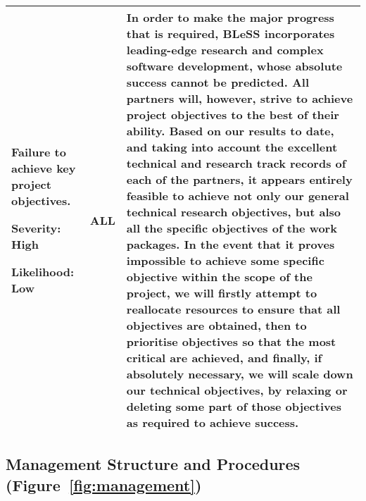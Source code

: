 \documentclass[a4paper,11pt]{article}
\newcommand{\project}[1]{\textbf{#1}\xspace}
\newcommand{\BLESS}{\project{BLeSS}}
\newcommand{\TheProject}{\BLESS}
\begin{document}
\begin{longtable}{| p{3.5cm} | p{1.5cm} | p{11.8cm}  |}
Failure to achieve key project objectives.
\par\vspace{1ex}
\textbf{Severity: High}
\par
\textbf{Likelihood: Low} &
ALL & 
In order to make the major progress that is required,
\TheProject{} incorporates leading-edge
research and complex software development, whose absolute success cannot be predicted. 
All partners will, however, strive to achieve project objectives
to the best of their ability.  Based on our results to date, and taking into account
the excellent technical and research track records of each of
the partners, it appears entirely feasible to achieve not only our general
technical research objectives, but also all the specific objectives
of the work packages.  In the event that it
proves impossible to achieve some specific objective within the
scope of the project, we will firstly attempt to reallocate
resources to ensure that all objectives are obtained, then
to prioritise objectives so that the most critical are achieved,
and finally, if absolutely necessary, we will scale down our technical objectives, by
relaxing or deleting some part of those objectives as required
to achieve success. 
\\\hline
\end{longtable}

\subsection{Management Structure and Procedures (Figure~\ref{fig:management})}
\label{sect:mgt}

\end{document}
